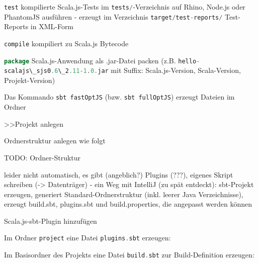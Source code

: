 \documentclass[a4paper, 12pt, hidelinks, listof=totoc, listoftables=totoc, bibliography=totoc]{scrreprt}
\newcommand{\code}[1]{\lstinline[language=Scala, style=inline]|#1|}
\begin{document}
\code{test} kompilierte Scala.js-Tests im \code{tests/}-Verzeichnis auf Rhino, Node.js oder PhantomJS ausführen
	- erzeugt im Verzeichnis \code{target/test-reports/} Test-Reports in XML-Form

\code{compile} kompiliert zu Scala.js Bytecode

\code{package} Scala.js-Anwendung als .jar-Datei packen (z.B. \code{hello-scalajs\_sjs0.6\_2.11-1.0.jar} mit Suffix: Scala.js-Version, Scala-Version, Projekt-Version)






Das Kommando \code{sbt fastOptJS} (bzw. \code{sbt fullOptJS}) erzeugt Dateien im Ordner
















>>Projekt anlegen


Ordnerstruktur anlegen wie folgt

TODO: Ordner-Struktur

leider nicht automatisch, es gibt (angeblich?) Plugins (???), eigenes Skript schreiben (-> Datenträger)
	- ein Weg mit IntelliJ (zu spät entdeckt): sbt-Projekt erzeugen, generiert Standard-Ordnerstruktur (inkl. leerer Java Verzeichnisse), erzeugt build.sbt, plugins.sbt und build.properties, die angepasst werden können


Scala.js-sbt-Plugin hinzufügen

Im Ordner \code{project} eine Datei \code{plugins.sbt} erzeugen:


Im Basisordner des Projekts eine Datei \code{build.sbt} zur Build-Definition erzeugen:

\end{document}
